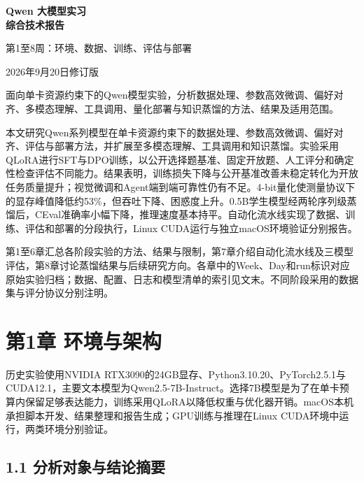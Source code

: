 \documentclass[UTF8,fontset=fandol,a4paper,11pt]{ctexart}
\begin{document}
\hypersetup{pageanchor=false}
\begin{titlepage}
\centering
\vspace*{28mm}
{\sffamily\bfseries\fontsize{26}{36}\selectfont Qwen 大模型实习\\综合技术报告\par}
\vspace{12mm}
{\large 第1至8周：环境、数据、训练、评估与部署\par}
\vspace{8mm}
{\large 2026年9月20日修订版\par}
\vfill
\begin{minipage}{0.82\textwidth}
\normalsize
面向单卡资源约束下的Qwen模型实验，分析数据处理、参数高效微调、偏好对齐、多模态理解、工具调用、量化部署与知识蒸馏的方法、结果及适用范围。
\end{minipage}
\vspace{22mm}
\end{titlepage}
\hypersetup{pageanchor=true}
\tableofcontents
\clearpage
{}
本文研究Qwen系列模型在单卡资源约束下的数据处理、参数高效微调、偏好对齐、评估与部署方法，并扩展至多模态理解、工具调用和知识蒸馏。实验采用QLoRA进行SFT与DPO训练，以公开选择题基准、固定开放题、人工评分和确定性检查评估不同能力。结果表明，训练损失下降与公开基准改善未稳定转化为开放任务质量提升；视觉微调和Agent端到端可靠性仍有不足。4-bit量化使测量协议下的显存峰值降低约53\%，但吞吐下降、困惑度上升。0.5B学生模型经两轮序列级蒸馏后，CEval准确率小幅下降，推理速度基本持平。自动化流水线实现了数据、训练、评估和部署的分段执行，Linux
CUDA运行与独立macOS环境验证分别报告。

第1至6章汇总各阶段实验的方法、结果与限制，第7章介绍自动化流水线及三模型评估，第8章讨论蒸馏结果与后续研究方向。各章中的Week、Day和run标识对应原始实验归档；数据、配置、日志和模型清单的索引见文末。不同阶段采用的数据集与评分协议分别注明。

\section{第1章
环境与架构}\label{ux7b2c1ux7ae0-ux73afux5883ux4e0eux67b6ux6784}

历史实验使用NVIDIA
RTX3090的24GB显存、Python3.10.20、PyTorch2.5.1与CUDA12.1，主要文本模型为Qwen2.5-7B-Instruct。选择7B模型是为了在单卡预算内保留足够表达能力，训练采用QLoRA以降低权重与优化器开销。macOS本机承担脚本开发、结果整理和报告生成；GPU训练与推理在Linux
CUDA环境中运行，两类环境分别验证。

\subsection{1.1 分析对象与结论摘要}\label{ux5206ux6790ux5bf9ux8c61ux4e0eux7ed3ux8bbaux6458ux8981}
\end{document}
